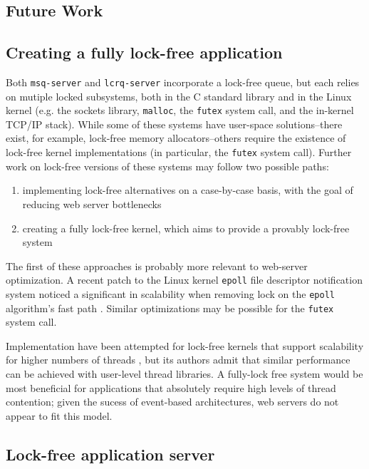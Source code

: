 \documentclass[twoside,10pt]{article}
\begin{document}
\begin{multicols}{2}
\section{Future Work}

\subsection{Creating a fully lock-free application}

Both \verb+msq-server+ and \verb+lcrq-server+ incorporate a lock-free
queue, but each relies on mutiple locked subsystems, both in the C
standard library and in the Linux kernel (e.g. the sockets library,
\verb+malloc+, the \verb+futex+ system call, and the in-kernel TCP/IP
stack). While some of these systems have user-space solutions\---there
exist, for example, lock-free memory allocators\---others require the
existence of lock-free kernel implementations (in particular, the
\verb+futex+ system call). Further work on lock-free versions of these
systems may follow two possible paths:
\begin{enumerate}
\item implementing lock-free alternatives on a case-by-case basis,
  with the goal of reducing web server bottlenecks 
\item creating a fully lock-free kernel, which aims to provide a
  provably lock-free system
\end{enumerate}

The first of these approaches is probably more relevant to web-server
optimization. A recent patch to the Linux kernel \verb+epoll+ file
descriptor notification system noticed a significant in scalability
when removing lock on the \verb+epoll+ algorithm's fast path
\cite{lockfree-epoll}. Similar optimizations may be possible for the
\verb+futex+ system call.

Implementation have been attempted for lock-free kernels that support
scalability for higher numbers of threads \cite{massalin1992lock}, but
its authors admit that similar performance can be achieved with
user-level thread libraries. A fully-lock free system would be most
beneficial for applications that absolutely require high levels of
thread contention; given the sucess of event-based architectures, web
servers do not appear to fit this model.

\subsection{Lock-free application server}


\end{multicols}
\end{document}
